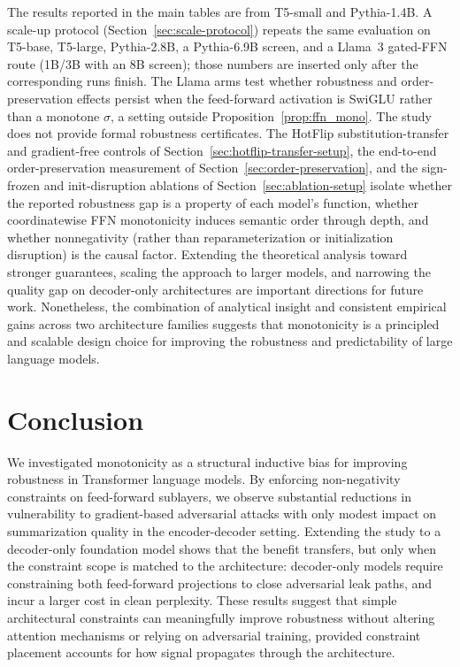 \documentclass{article}
\theoremstyle{plain}
\theoremstyle{definition}
\theoremstyle{remark}
\begin{document}
The results reported in the main tables are from T5-small and Pythia-1.4B. A scale-up protocol (Section~\ref{sec:scale-protocol}) repeats the same evaluation on T5-base, T5-large, Pythia-2.8B, a Pythia-6.9B screen, and a Llama~3 gated-FFN route (1B/3B with an 8B screen); those numbers are inserted only after the corresponding runs finish. The Llama arms test whether robustness and order-preservation effects persist when the feed-forward activation is SwiGLU rather than a monotone $\sigma$, a setting outside Proposition~\ref{prop:ffn_mono}. The study does not provide formal robustness certificates. The HotFlip substitution-transfer and gradient-free controls of Section~\ref{sec:hotflip-transfer-setup}, the end-to-end order-preservation measurement of Section~\ref{sec:order-preservation}, and the sign-frozen and init-disruption ablations of Section~\ref{sec:ablation-setup} isolate whether the reported robustness gap is a property of each model's function, whether coordinatewise FFN monotonicity induces semantic order through depth, and whether nonnegativity (rather than reparameterization or initialization disruption) is the causal factor. Extending the theoretical analysis toward stronger guarantees, scaling the approach to larger models, and narrowing the quality gap on decoder-only architectures are important directions for future work. Nonetheless, the combination of analytical insight and consistent empirical gains across two architecture families suggests that monotonicity is a principled and scalable design choice for improving the robustness and predictability of large language models.


\section{Conclusion}

We investigated monotonicity as a structural inductive bias for improving robustness in Transformer language models. By enforcing non-negativity constraints on feed-forward sublayers, we observe substantial reductions in vulnerability to gradient-based adversarial attacks with only modest impact on summarization quality in the encoder-decoder setting. Extending the study to a decoder-only foundation model shows that the benefit transfers, but only when the constraint scope is matched to the architecture: decoder-only models require constraining both feed-forward projections to close adversarial leak paths, and incur a larger cost in clean perplexity. These results suggest that simple architectural constraints can meaningfully improve robustness without altering attention mechanisms or relying on adversarial training, provided constraint placement accounts for how signal propagates through the architecture.
\end{document}

